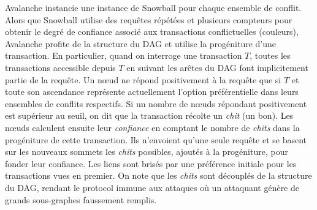 %    

Avalanche instancie une instance de Snowball pour chaque ensemble de conflit.
Alors que Snowball utilise des requêtes répétées et plusieurs compteurs pour obtenir le degré de confiance associé aux transactions conflictuelles (couleurs),
Avalanche profite de la structure du DAG et utilise la progéniture d'une transaction.
En particulier, quand on interroge une transaction $T$, toutes les transactions accessible depuis $T$ en suivant les arêtes du DAG font implicitement partie de la requête.
Un nœud ne répond positivement à la requête que si $T$ et toute son ascendance représente actuellement l'option préférentielle dans leurs ensembles de conflits respectifs.
Si un nombre de nœuds répondant positivement est supérieur au seuil, on dit que la transaction récolte un \emph{chit} (un bon).
Les nœuds calculent ensuite leur \emph{confiance} en comptant le nombre de \emph{chits} dans la progéniture de cette transaction.
Ils n'envoient qu'une seule requête et se basent sur les nouveaux sommets les \emph{chits} possibles, ajoutés à la progéniture, pour fonder leur confiance.
Les liens sont brisés par une préférence initiale pour les transactions vues en premier.
On note que les \emph{chits} sont découplés de la structure du DAG, rendant le protocol immune aux attaques où un attaquant génère de grands sous-graphes faussement remplis.

